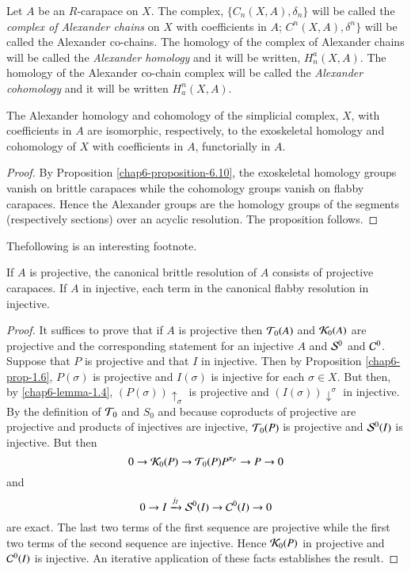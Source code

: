 \begin{definition}\label{chap6-definition-7.4}
Let $A$ be an $R$-carapace on $X$. The complex, $\{C_{n}(X, A), \delta_{n}\}$ will be called the \textit{complex of Alexander chains} on $X$ with coefficients in $A$; $C^{n}(X, A), \delta^{n}\}$ will be called the Alexander co-chains. The homology of the complex of Alexander chains will be called the \textit{Alexander homology} and it will be written, $H_{n}^{a}(X, A)$. The homology of the Alexander co-chain complex will be called the \textit{Alexander cohomology} and it will be written $H_{a}^{n}(X, A)$. 
\end{definition}

\begin{secprop}\label{chap6-proposition-7.5}
The Alexander homology and cohomology of the simplicial complex, $X$, with coefficients in $A$ are isomorphic, respectively, to the exoskeletal homology and cohomology of $X$ with coefficients in $A$, functorially in $A$.
\end{secprop}

\begin{proof}
By Proposition \ref{chap6-proposition-6.10}, the exoskeletal homology groups vanish on brittle carapaces while the cohomology groups vanish on flabby carapaces. Hence the Alexander groups are the homology groups of the segments (respectively sections) over an acyclic resolution. The proposition follows.
\end{proof}

The\pageoriginale following is an interesting footnote.

\begin{secprop}\label{chap6-proposition-7.6}
If $A$ is projective, the canonical brittle resolution of $A$ consists of projective carapaces. If $A$ in injective, each term in the canonical flabby resolution in injective.
\end{secprop}

\begin{proof}
It suffices to prove that if $A$ is projective then $\mathcal{T}_{0}(A)$ and $\mathcal{K}_{0}(A)$ are projective and the corresponding statement for an injective $A$ and $\mathcal{S}^{0}$ and $\mathcal{C}^{0}$. Suppose that $P$ is projective and that $I$ in injective. Then by Proposition \ref{chap6-prop-1.6}, $P(\sigma)$ is projective and $I(\sigma)$ is injective for each $\sigma \in X$. But then, by \ref{chap6-lemma-1.4}, $(P(\sigma))\uparrow_{\sigma}$ is projective and $(I(\sigma))\downarrow^{\sigma}$ in injective. By the definition of $\mathcal{T}_{0}$ and $S_{0}$ and because coproducts of projective are projective and products of injectives are injective, $\mathcal{T}_{0}(P)$ is projective and $\mathcal{S}^{0}(I)$ is injective. But then
$$
0 \rightarrow \mathcal{K}_{0}(P) \rightarrow \mathcal{T}_{0}(P) P^{\pi_{P}} \rightarrow P \rightarrow 0
$$
and
$$
0 \rightarrow I \xrightarrow{j_{I}} \mathcal{S}^{0}(I) \rightarrow \mathcal{C}^{0}(I)\rightarrow 0
$$
are exact. The last two terms of the first sequence are projective while the first two terms of the second sequence are injective. Hence $\mathcal{K}_{0}(P)$ in projective and $\mathcal{C}^{0}(I)$ is injective. An iterative application of these facts establishes the result.
\end{proof}

